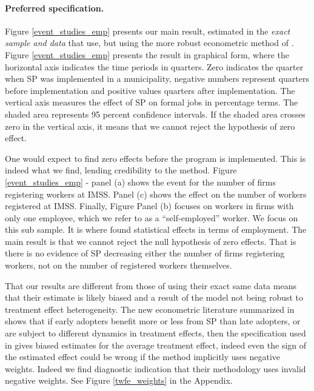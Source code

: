 \documentclass[oneside,11pt]{article}
\begin{document}
\paragraph{Preferred specification.} Figure \ref{event_studies_emp} presents our main result, estimated in the \textit{exact sample and data} that \cite{Campos} use, but using the more robust econometric method of \cite{deChaisemartin2020}. Figure \ref{event_studies_emp} presents the result in graphical form, where the horizontal axis indicates the time periods in quarters. Zero indicates the quarter when SP was implemented in a municipality, negative numbers represent quarters before implementation and positive values quarters after implementation. The vertical axis measures the effect of SP on formal jobs in percentage terms. The shaded area represents 95 percent confidence intervals. If the shaded area crosses zero in the vertical axis, it means that we cannot reject the hypothesis of zero effect.

One would expect to find zero effects before the program is implemented. This is indeed what we find, lending credibility to the method. %
Figure \ref{event_studies_emp} - panel (a) shows the event for the number of firms registering workers at IMSS. Panel (c) shows the effect on the number of workers registered at IMSS. Finally, Figure Panel (b) focuses on workers in firms with only one employee, which we refer to as a ``self-employed'' worker. We focus on this sub sample. It is where \cite{Campos} found statistical effects in terms of employment. The main result is that we cannot reject the null hypothesis of zero effects. That is there is no evidence of SP decreasing either the number of firms registering workers, not on the number of registered workers themselves.

That our results are different from those of \cite{Campos} using their exact same data means that their estimate is likely biased and a result of the model not being robust to treatment effect heterogeneity. The new econometric literature summarized in \cite{DID_survey} shows that if early adopters benefit more or less from SP than late adopters, or are subject to different dynamics in treatment effects, then the specification used in \cite{Campos} gives biased estimates for the average treatment effect, indeed even the sign of the estimated effect could be wrong if the method implicitly uses negative weights. Indeed we find diagnostic indication that their methodology uses invalid negative weights. See Figure \ref{twfe_weights} in the Appendix. 
\end{document}

